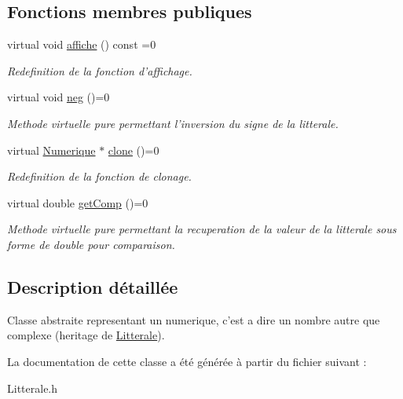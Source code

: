 \subsection*{Fonctions membres publiques}
\begin{CompactItemize}
\item 
\hypertarget{class_numerique_f6d64b345f536d45454ba424d59a8ee4}{
virtual void \hyperlink{class_numerique_f6d64b345f536d45454ba424d59a8ee4}{affiche} () const =0}
\label{class_numerique_f6d64b345f536d45454ba424d59a8ee4}

\begin{CompactList}\small\item\em Redefinition de la fonction d'affichage. \item\end{CompactList}\item 
\hypertarget{class_numerique_5d88a526f166b01e5c116d7342daa7e8}{
virtual void \hyperlink{class_numerique_5d88a526f166b01e5c116d7342daa7e8}{neg} ()=0}
\label{class_numerique_5d88a526f166b01e5c116d7342daa7e8}

\begin{CompactList}\small\item\em Methode virtuelle pure permettant l'inversion du signe de la litterale. \item\end{CompactList}\item 
\hypertarget{class_numerique_facd4108df61baa46c639c8e15b23c7f}{
virtual \hyperlink{class_numerique}{Numerique} $\ast$ \hyperlink{class_numerique_facd4108df61baa46c639c8e15b23c7f}{clone} ()=0}
\label{class_numerique_facd4108df61baa46c639c8e15b23c7f}

\begin{CompactList}\small\item\em Redefinition de la fonction de clonage. \item\end{CompactList}\item 
\hypertarget{class_numerique_d6a208d078f63b62160d255a52c0ab1c}{
virtual double \hyperlink{class_numerique_d6a208d078f63b62160d255a52c0ab1c}{getComp} ()=0}
\label{class_numerique_d6a208d078f63b62160d255a52c0ab1c}

\begin{CompactList}\small\item\em Methode virtuelle pure permettant la recuperation de la valeur de la litterale sous forme de double pour comparaison. \item\end{CompactList}\end{CompactItemize}


\subsection{Description détaillée}
Classe abstraite representant un numerique, c'est a dire un nombre autre que complexe (heritage de \hyperlink{class_litterale}{Litterale}). 

La documentation de cette classe a été générée à partir du fichier suivant :\begin{CompactItemize}
\item 
Litterale.h\end{CompactItemize}
